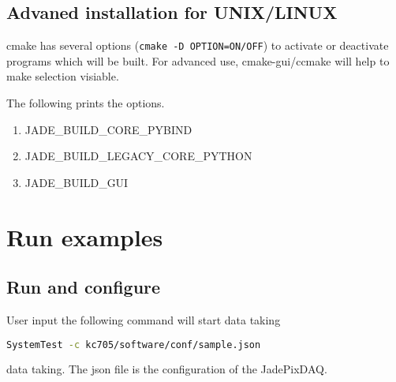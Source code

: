 \documentclass[12pt,a4paper]{article}
\begin{document}
\subsection{Advaned installation for UNIX/LINUX}
\label{advaned-installation-for-unixlinux}

cmake has several options (\texttt{cmake\ -D\ OPTION=ON/OFF}) to activate or
deactivate programs which will be built. For advanced use, cmake-gui/ccmake will
help to make selection visiable.

The following prints the options.

\begin{enumerate}
	\item{JADE\_BUILD\_CORE\_PYBIND}
	\item{JADE\_BUILD\_LEGACY\_CORE\_PYTHON}
	\item{JADE\_BUILD\_GUI}
\end{enumerate}

\section{Run examples}
\label{run-examples}

\subsection{Run and configure}
\label{run-and-configure}

User input the following command will start data taking

\begin{lstlisting}[language=bash]
SystemTest -c kc705/software/conf/sample.json 
\end{lstlisting}

data taking. The json file is the configuration of the JadePixDAQ.
\end{document}
